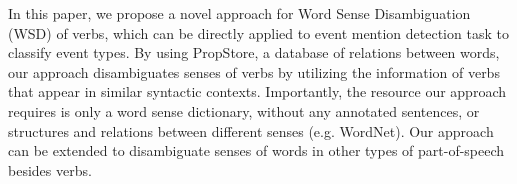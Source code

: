 In this paper, we propose a novel approach for Word Sense Disambiguation (WSD) of verbs, which can be directly applied to event mention detection task to classify event types. By using PropStore, a database of relations between words, our approach disambiguates senses of verbs by utilizing the information of verbs that appear in similar syntactic contexts. Importantly, the resource our approach requires is only a word sense dictionary, without any annotated sentences, or structures and relations between different senses (e.g. WordNet). Our approach can be extended to disambiguate senses of words in other types of part-of-speech besides verbs.
